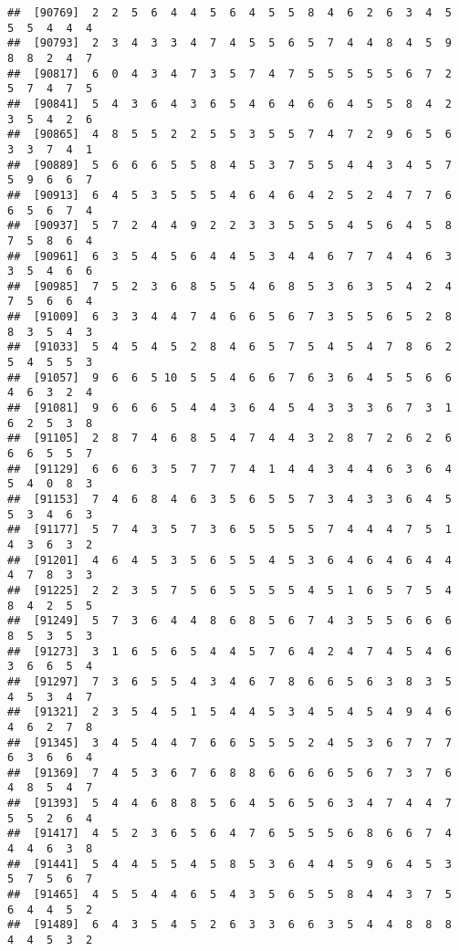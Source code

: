 \documentclass[
]{book}
\begin{document}
\begin{verbatim}
##  [90769]  2  2  5  6  4  4  5  6  4  5  5  8  4  6  2  6  3  4  5  5  5  4  4  4
##  [90793]  2  3  4  3  3  4  7  4  5  5  6  5  7  4  4  8  4  5  9  8  8  2  4  7
##  [90817]  6  0  4  3  4  7  3  5  7  4  7  5  5  5  5  5  6  7  2  5  7  4  7  5
##  [90841]  5  4  3  6  4  3  6  5  4  6  4  6  6  4  5  5  8  4  2  3  5  4  2  6
##  [90865]  4  8  5  5  2  2  5  5  3  5  5  7  4  7  2  9  6  5  6  3  3  7  4  1
##  [90889]  5  6  6  6  5  5  8  4  5  3  7  5  5  4  4  3  4  5  7  5  9  6  6  7
##  [90913]  6  4  5  3  5  5  5  4  6  4  6  4  2  5  2  4  7  7  6  6  5  6  7  4
##  [90937]  5  7  2  4  4  9  2  2  3  3  5  5  5  4  5  6  4  5  8  7  5  8  6  4
##  [90961]  6  3  5  4  5  6  4  4  5  3  4  4  6  7  7  4  4  6  3  3  5  4  6  6
##  [90985]  7  5  2  3  6  8  5  5  4  6  8  5  3  6  3  5  4  2  4  7  5  6  6  4
##  [91009]  6  3  3  4  4  7  4  6  6  5  6  7  3  5  5  6  5  2  8  8  3  5  4  3
##  [91033]  5  4  5  4  5  2  8  4  6  5  7  5  4  5  4  7  8  6  2  5  4  5  5  3
##  [91057]  9  6  6  5 10  5  5  4  6  6  7  6  3  6  4  5  5  6  6  4  6  3  2  4
##  [91081]  9  6  6  6  5  4  4  3  6  4  5  4  3  3  3  6  7  3  1  6  2  5  3  8
##  [91105]  2  8  7  4  6  8  5  4  7  4  4  3  2  8  7  2  6  2  6  6  6  5  5  7
##  [91129]  6  6  6  3  5  7  7  7  4  1  4  4  3  4  4  6  3  6  4  5  4  0  8  3
##  [91153]  7  4  6  8  4  6  3  5  6  5  5  7  3  4  3  3  6  4  5  5  3  4  6  3
##  [91177]  5  7  4  3  5  7  3  6  5  5  5  5  7  4  4  4  7  5  1  4  3  6  3  2
##  [91201]  4  6  4  5  3  5  6  5  5  4  5  3  6  4  6  4  6  4  4  4  7  8  3  3
##  [91225]  2  2  3  5  7  5  6  5  5  5  5  4  5  1  6  5  7  5  4  8  4  2  5  5
##  [91249]  5  7  3  6  4  4  8  6  8  5  6  7  4  3  5  5  6  6  6  8  5  3  5  3
##  [91273]  3  1  6  5  6  5  4  4  5  7  6  4  2  4  7  4  5  4  6  3  6  6  5  4
##  [91297]  7  3  6  5  5  4  3  4  6  7  8  6  6  5  6  3  8  3  5  4  5  3  4  7
##  [91321]  2  3  5  4  5  1  5  4  4  5  3  4  5  4  5  4  9  4  6  4  6  2  7  8
##  [91345]  3  4  5  4  4  7  6  6  5  5  5  2  4  5  3  6  7  7  7  6  3  6  6  4
##  [91369]  7  4  5  3  6  7  6  8  8  6  6  6  6  5  6  7  3  7  6  4  8  5  4  7
##  [91393]  5  4  4  6  8  8  5  6  4  5  6  5  6  3  4  7  4  4  7  5  5  2  6  4
##  [91417]  4  5  2  3  6  5  6  4  7  6  5  5  5  6  8  6  6  7  4  4  4  6  3  8
##  [91441]  5  4  4  5  5  4  5  8  5  3  6  4  4  5  9  6  4  5  3  5  7  5  6  7
##  [91465]  4  5  5  4  4  6  5  4  3  5  6  5  5  8  4  4  3  7  5  6  4  4  5  2
##  [91489]  6  4  3  5  4  5  2  6  3  3  6  6  3  5  4  4  8  8  8  4  4  5  3  2

\end{verbatim}
\end{document}
